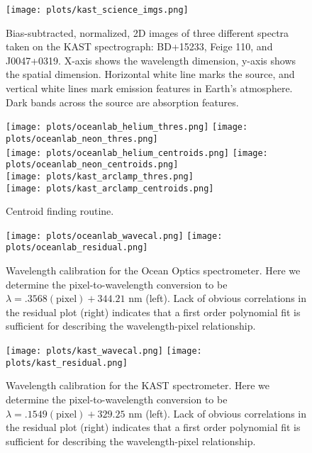 \documentclass[preprint]{aastex62}
\begin{document}
\begin{figure}[H]
\begin{center}
\texttt{[image: plots/kast\_science\_imgs.png]} 
\caption{Bias-subtracted, normalized, 2D images of three different spectra taken on the KAST spectrograph: BD+15233, Feige 110, and J0047+0319. X-axis shows the wavelength dimension, y-axis shows the spatial dimension. Horizontal white line marks the source, and vertical white lines mark emission features in Earth's atmosphere. Dark bands across the source are absorption features.} \label{fig:science_images}
\end{center}
\end{figure}

\begin{figure}[H]
\begin{center}
\texttt{[image: plots/oceanlab\_helium\_thres.png]}
\texttt{[image: plots/oceanlab\_neon\_thres.png]} \\
\texttt{[image: plots/oceanlab\_helium\_centroids.png]}
\texttt{[image: plots/oceanlab\_neon\_centroids.png]} \\
\texttt{[image: plots/kast\_arclamp\_thres.png]} \\
\texttt{[image: plots/kast\_arclamp\_centroids.png]} 
\caption{Centroid finding routine.} \label{fig:centoid}
\end{center}
\end{figure}

\begin{figure}[H]
\begin{center}
\texttt{[image: plots/oceanlab\_wavecal.png]}
\texttt{[image: plots/oceanlab\_residual.png]}
\caption{Wavelength calibration for the Ocean Optics spectrometer. Here we determine the pixel-to-wavelength conversion to be $\lambda=.3568(\mathrm{pixel})+344.21$ nm (left). Lack of obvious correlations in the residual plot (right) indicates that a first order polynomial fit is sufficient for describing the wavelength-pixel relationship.} \label{fig:oceanlab_wavecal}
\end{center}
\end{figure}

\begin{figure}[H]
\begin{center}
\texttt{[image: plots/kast\_wavecal.png]}
\texttt{[image: plots/kast\_residual.png]}
\caption{Wavelength calibration for the KAST spectrometer. Here we determine the pixel-to-wavelength conversion to be $\lambda=.1549(\mathrm{pixel})+329.25$ nm (left). Lack of obvious correlations in the residual plot (right) indicates that a first order polynomial fit is sufficient for describing the wavelength-pixel relationship.} \label{fig:kast_wavecal}
\end{center}
\end{figure}
\end{document}
